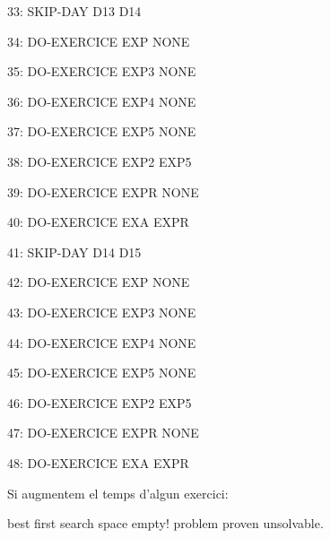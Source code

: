 \documentclass[a4paper,12pt, UTF-8]{article}
\begin{document}
    33: SKIP-DAY D13 D14
    
    34: DO-EXERCICE EXP NONE
    
    35: DO-EXERCICE EXP3 NONE
    
    36: DO-EXERCICE EXP4 NONE
    
    37: DO-EXERCICE EXP5 NONE
    
    38: DO-EXERCICE EXP2 EXP5
    
    39: DO-EXERCICE EXPR NONE
    
    40: DO-EXERCICE EXA EXPR
    
    41: SKIP-DAY D14 D15
    
    42: DO-EXERCICE EXP NONE
    
    43: DO-EXERCICE EXP3 NONE
    
    44: DO-EXERCICE EXP4 NONE
    
    45: DO-EXERCICE EXP5 NONE
    
    46: DO-EXERCICE EXP2 EXP5
    
    47: DO-EXERCICE EXPR NONE
    
    48: DO-EXERCICE EXA EXPR

\setlength{\parskip}{0.7em}


Si augmentem el temps d'algun exercici:

best first search space empty! problem proven unsolvable.
\end{document}
